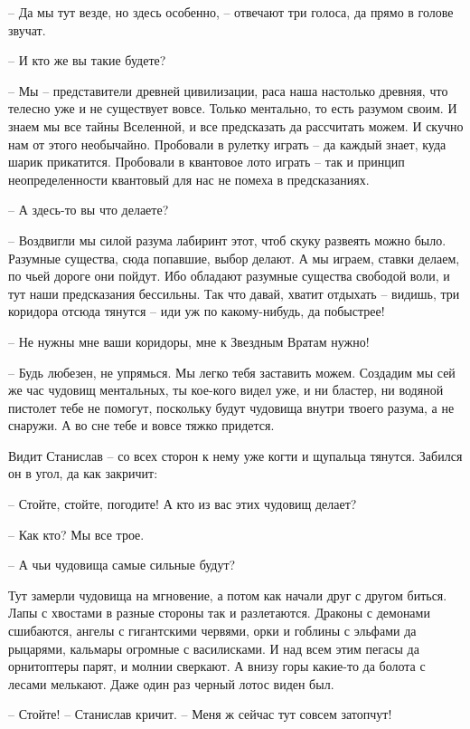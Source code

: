 \documentclass[ebook,oneside,final,openright]{memoir}
\begin{document}
– Да мы тут везде, но здесь особенно, – отвечают три голоса, да прямо в голове звучат.\par
– И кто же вы такие будете?\par
– Мы – представители древней цивилизации, раса наша настолько древняя, что телесно уже и не существует вовсе. Только ментально, то есть разумом своим. И знаем мы все тайны Вселенной, и все предсказать да рассчитать можем. И скучно нам от этого необычайно. Пробовали в рулетку играть – да каждый знает, куда шарик прикатится. Пробовали в квантовое лото играть – так и принцип неопределенности квантовый для нас не помеха в предсказаниях.\par
– А здесь-то вы что делаете?\par
– Воздвигли мы силой разума лабиринт этот, чтоб скуку развеять можно было. Разумные существа, сюда попавшие, выбор делают. А мы играем, ставки делаем, по чьей дороге они пойдут. Ибо обладают разумные существа свободой воли, и тут наши предсказания бессильны. Так что давай, хватит отдыхать – видишь, три коридора отсюда тянутся – иди уж по какому-нибудь, да побыстрее!\par
– Не нужны мне ваши коридоры, мне к Звездным Вратам нужно!\par
– Будь любезен, не упрямься. Мы легко тебя заставить можем. Создадим мы сей же час чудовищ ментальных, ты кое-кого видел уже, и ни бластер, ни водяной пистолет тебе не помогут, поскольку будут чудовища внутри твоего разума, а не снаружи. А во сне тебе и вовсе тяжко придется.\par
\par
Видит Станислав – со всех сторон к нему уже когти и щупальца тянутся. Забился он в угол, да как закричит:\par
– Стойте, стойте, погодите! А кто из вас этих чудовищ делает?\par
– Как кто? Мы все трое.\par
– А чьи чудовища самые сильные будут?\par
Тут замерли чудовища на мгновение, а потом как начали друг с другом биться. Лапы с хвостами в разные стороны так и разлетаются. Драконы с демонами сшибаются, ангелы с гигантскими червями, орки и гоблины с эльфами да рыцарями, кальмары огромные с василисками. И над всем этим пегасы да орнитоптеры парят, и молнии сверкают. А внизу горы какие-то да болота с лесами мелькают. Даже один раз черный лотос виден был. \par
– Стойте! – Станислав кричит. – Меня ж сейчас тут совсем затопчут!\par
\end{document}
